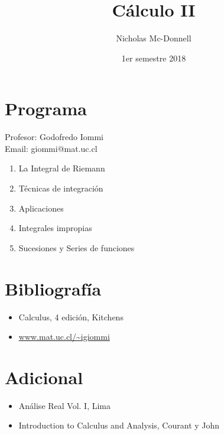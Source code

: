 

\title{Cálculo II}
\author{Nicholas Mc-Donnell}
\date{1er semestre 2018}



    \maketitle

    \newpage 
    \section*{Programa}
    {\raggedleft Profesor: Godofredo Iommi}\\
    Email: giommi@mat.uc.cl
    \begin{enumerate}
        \item La Integral de Riemann

        \item Técnicas de integración

        \item Aplicaciones

        \item Integrales impropias

        \item Sucesiones y Series de funciones
    \end{enumerate}

    \section*{Bibliografía}
    \begin{itemize}
        \item Calculus, 4 edición, Kitchens

        \item \url{www.mat.uc.cl/~igiommi}

    \end{itemize}

    \section*{Adicional}
    \begin{itemize}
        \item Análise Real Vol. I, Lima

        \item Introduction to Calculus and Analysis, Courant y John
    \end{itemize}

